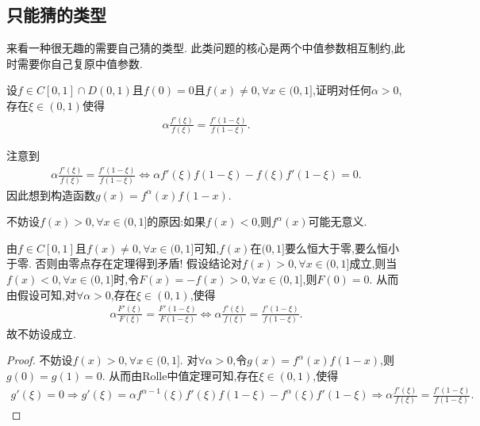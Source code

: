 \documentclass[../../main.tex]{subfiles}%
\begin{document}
\subsection{只能猜的类型}
来看一种很无趣的需要自己猜的类型. 此类问题的核心是两个中值参数相互制约,此时需要你自己复原中值参数.

\begin{example}
设\(f\in C[0,1]\cap D(0,1)\)且\(f(0)=0\)且\(f(x)\neq0,\forall x\in(0,1]\),证明对任何\(\alpha>0\),存在\(\xi\in(0,1)\)使得
\begin{align*}
\alpha\frac{f'(\xi)}{f(\xi)}=\frac{f'(1 - \xi)}{f(1 - \xi)}.
\end{align*} 
\end{example}
\begin{remark}
注意到
\begin{align*}
\alpha \frac{f' \left( \xi \right)}{f\left( \xi \right)}=\frac{f' \left( 1-\xi \right)}{f\left( 1-\xi \right)}\Leftrightarrow \alpha f' \left( \xi \right) f\left( 1-\xi \right) -f\left( \xi \right) f' \left( 1-\xi \right) =0.
\end{align*}
因此想到构造函数$g(x)=f^{\alpha}(x)f(1 - x)$.
\end{remark}
\begin{note}
不妨设\(f(x)>0,\forall x\in(0,1]\)的原因:如果$f(x)<0$,则$f^{\alpha}(x)$可能无意义.

由\(f\in C[0,1]\)且\(f(x)\neq0,\forall x\in(0,1]\)可知,\(f(x)\)在\((0,1]\)要么恒大于零,要么恒小于零. 否则由零点存在定理得到矛盾! 假设结论对\(f(x)>0,\forall x\in(0,1]\)成立,则当\(f(x)<0,\forall x\in(0,1]\)时,令\(F(x)=-f(x)>0,\forall x\in(0,1]\),则\(F(0)=0\). 从而由假设可知,对\(\forall \alpha>0\),存在\(\xi\in(0,1)\),使得
\begin{align*}
\alpha \frac{F'(\xi)}{F(\xi)}=\frac{F'(1 - \xi)}{F(1 - \xi)}\Leftrightarrow \alpha \frac{f'(\xi)}{f(\xi)}=\frac{f'(1 - \xi)}{f(1 - \xi)}.
\end{align*}
故不妨设成立. 
\end{note}
\begin{proof}
不妨设\(f(x)>0,\forall x\in(0,1]\). 对$\forall \alpha>0$,令\(g(x)=f^{\alpha}(x)f(1 - x)\),则\(g(0)=g(1)=0\). 从而由Rolle中值定理可知,存在\(\xi\in(0,1)\),使得
\begin{align*}
g'(\xi) = 0\Rightarrow g'(\xi)=\alpha f^{\alpha - 1}(\xi)f'(\xi)f(1 - \xi)-f^{\alpha}(\xi)f'(1 - \xi)
\Rightarrow \alpha \frac{f'(\xi)}{f(\xi)}=\frac{f'(1 - \xi)}{f(1 - \xi)}.
\end{align*}
\end{proof}
\end{document}
